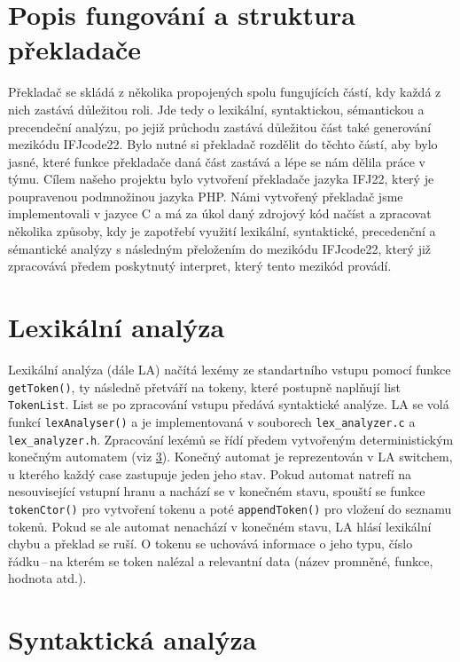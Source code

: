 \documentclass[a4paper, 12pt]{article}
\begin{document}
    \section{Popis fungování a struktura překladače}
    Překladač se skládá z několika propojených spolu fungujících částí, kdy každá z nich zastává důležitou roli. Jde tedy o lexikální, syntaktickou, sémantickou a precendeční analýzu, po jejiž průchodu zastává důležitou část také generování mezikódu IFJcode22. Bylo nutné si překladač rozdělit do těchto částí, aby bylo jasné, které funkce překladače daná část zastává a lépe se nám dělila práce v týmu.
        Cílem našeho projektu bylo vytvoření překladače jazyka IFJ22, který je poupravenou podmnožinou jazyka PHP. Námi vytvořený překladač jsme implementovali v jazyce C a  má za úkol daný zdrojový kód načíst a zpracovat několika způsoby, kdy je zapotřebí využití lexikální, syntaktické, precedenční a sémantické analýzy s následným přeložením do mezikódu IFJcode22, který již zpracovává předem poskytnutý interpret, který tento mezikód provádí.
    \section{Lexikální analýza}
    Lexikální analýza (dále LA) načítá lexémy ze standartního vstupu pomocí funkce \texttt{getToken()}, ty následně přetváří na tokeny, které postupně naplňují list \texttt{TokenList}. List se po zpracování vstupu předává syntaktické analýze. LA se volá funkcí \texttt{lexAnalyser()} a je implementovaná v souborech \texttt{lex\_analyzer.c} a \texttt{lex\_analyzer.h}. Zpracování lexémů se řídí předem vytvořeným deterministickým konečným automatem (viz \ref{}). Konečný automat je reprezentován v LA  switchem, u kterého každý case zastupuje jeden jeho stav. Pokud automat natrefí na nesouvisející vstupní hranu a nachází se v konečném stavu, spouští se funkce \texttt{tokenCtor()} pro vytvoření tokenu a poté \texttt{appendToken()} pro vložení do seznamu tokenů. Pokud se ale automat nenachází v konečném stavu, LA hlásí lexikální chybu a překlad se ruší. O tokenu se uchovává informace o jeho typu, číslo řádku\,--\,na kterém se token nalézal a relevantní data (název promněné, funkce, hodnota atd.).

    \section{Syntaktická analýza}
\end{document}
